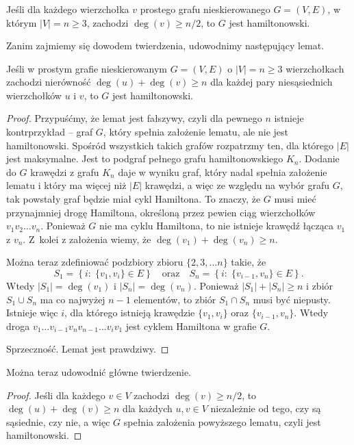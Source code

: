 \subsubsection{} %
\begin{twierdzenie*}[Dirac]
	Jeśli dla każdego wierzchołka $v$ prostego grafu nieskierowanego $G=(V,E)$, w którym $|V|=n\ge 3$, zachodzi $\deg(v)\ge n/2$, to $G$ jest hamiltonowski.
\end{twierdzenie*}
Zanim zajmiemy się dowodem twierdzenia, udowodnimy następujący lemat.
\begin{lemat*}[Ore]
	Jeśli w prostym grafie nieskierowanym $G=(V,E)$ o $|V|=n\ge 3$ wierzchołkach zachodzi nierówność $\deg(u)+\deg(v)\ge n$ dla każdej pary niesąsiednich wierzchołków $u$ i $v$, to $G$ jest hamiltonowski.
\end{lemat*}
\begin{proof}
Przypuśćmy, że lemat jest fałszywy, czyli dla pewnego $n$ istnieje kontrprzykład -- graf $G$, który spełnia założenie lematu, ale nie jest hamiltonowski. Spośród wszystkich takich grafów rozpatrzmy ten, dla którego $|E|$ jest maksymalne. Jest to podgraf pełnego grafu hamiltonowskiego $K_n$. Dodanie do $G$ krawędzi z grafu $K_n$ daje w wyniku graf, który nadal spełnia założenie lematu i który ma więcej niż $|E|$ krawędzi, a więc ze względu na wybór grafu $G$, tak powstały graf będzie miał cykl Hamiltona. To znaczy, że $G$ musi mieć przynajmniej drogę Hamiltona, określoną przez pewien ciąg wierzchołków $v_1v_2\dots v_n$. Ponieważ $G$ nie ma cyklu Hamiltona, to nie istnieje krawędź łącząca $v_1$ z $v_n$. Z~kolei z założenia wiemy, że $\deg(v_1)+\deg(v_n)\ge n$.

Można teraz zdefiniować podzbiory zbioru $\{2,3,\dots n\}$ takie, że
\[
	S_1 = \left\{ i:\;\{ v_1,v_i\}\in E\right\}\quad\mbox{oraz}\quad S_n = \left\{ i:\;\{ v_{i-1},v_n\}\in E\right\}.
\]
Wtedy $|S_1|=\deg(v_1)$ i $|S_n|=\deg(v_n)$. Ponieważ $|S_1|+|S_n|\ge n$ i zbiór $S_1\cup S_n$ ma co najwyżej $n-1$ elementów, to zbiór $S_1\cap S_n$ musi być niepusty. Istnieje więc $i$, dla którego istnieją krawędzie $\{ v_1,v_i\}$ oraz $\{ v_{i-1},v_n\}$. Wtedy droga $v_1\dots v_{i-1}v_nv_{n-1}\dots v_iv_1$ jest cyklem Hamiltona w grafie $G$.

Sprzeczność. Lemat jest prawdziwy.
\end{proof}

Można teraz udowodnić główne twierdzenie.
\begin{proof}
Jeśli dla każdego $v\in V$ zachodzi $\deg(v)\ge n/2$, to $\deg(u)+\deg(v)\ge n$ dla każdych $u,v\in V$ niezależnie od tego, czy są sąsiednie, czy nie, a więc $G$ spełnia założenia powyższego lematu, czyli jest hamiltonowski.
\end{proof}


